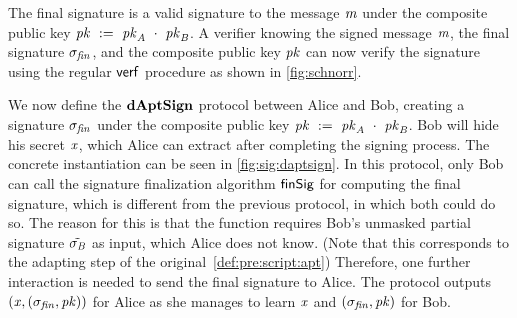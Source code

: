 The final signature is a valid signature to the message $\mathit{m}$ under the composite public key $\mathit{pk} ~:=~ \mathit{pk}_{\mathit{A}} ~\cdot~ \mathit{pk}_{\mathit{B}}$.
A verifier knowing the signed message $\mathit{m}$, the final signature $\sigma_{\mathit{fin}}$, and the composite public key $\mathit{pk}$ can now verify the signature using the regular $\mathsf{verf}$ procedure as shown in \cref{fig:schnorr}.

We now define the $\mathbf{dAptSign}$ protocol between Alice and Bob, creating a signature $\sigma_{\mathit{fin}}$ under the composite public key $\mathit{pk} ~:=~ \mathit{pk}_{\mathit{A}} ~\cdot~ \mathit{pk}_{\mathit{B}}$.
Bob will hide his secret $\mathit{x}$, which Alice can extract after completing the signing process.
The concrete instantiation can be seen in \cref{fig:sig:daptsign}.
In this protocol, only Bob can call the signature finalization algorithm $\mathsf{finSig}$ for computing the final signature, which is different from the previous protocol, in which both could do so.
The reason for this is that the function requires Bob's unmasked partial signature $\tilde{\sigma_{\mathit{B}}}$ as input, which Alice does not know. (Note that this corresponds to the adapting step of the original~\cref{def:pre:script:apt})
Therefore, one further interaction is needed to send the final signature to Alice.
The protocol outputs $(\mathit{x}, (\sigma_{\mathit{fin}}, \mathit{pk}))$ for Alice as she manages to learn $\mathit{x}$ and $(\sigma_{\mathit{fin}}, \mathit{pk})$ for Bob.


